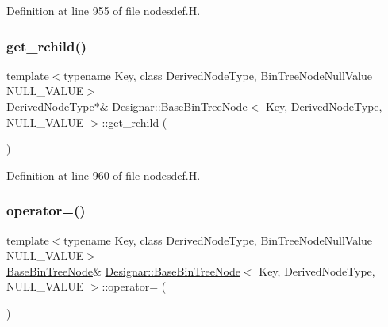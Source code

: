 Definition at line 955 of file nodesdef.\+H.

\mbox{\label{class_designar_1_1_base_bin_tree_node_a328220c701b0c58b024610cf8fb70850}} 
\subsubsection{\texorpdfstring{get\+\_\+rchild()}{get\_rchild()}}
{\footnotesize\ttfamily template$<$typename Key, class Derived\+Node\+Type, Bin\+Tree\+Node\+Null\+Value N\+U\+L\+L\+\_\+\+V\+A\+L\+UE$>$ \\
Derived\+Node\+Type$\ast$\& \hyperlink{class_designar_1_1_base_bin_tree_node}{Designar\+::\+Base\+Bin\+Tree\+Node}$<$ Key, Derived\+Node\+Type, N\+U\+L\+L\+\_\+\+V\+A\+L\+UE $>$\+::get\+\_\+rchild (\begin{DoxyParamCaption}{ }\end{DoxyParamCaption})\hspace{0.3cm}{\ttfamily [inline]}}



Definition at line 960 of file nodesdef.\+H.

\mbox{\label{class_designar_1_1_base_bin_tree_node_acde689f73c8d4fce33926e86882b0765}} 
\subsubsection{\texorpdfstring{operator=()}{operator=()}}
{\footnotesize\ttfamily template$<$typename Key, class Derived\+Node\+Type, Bin\+Tree\+Node\+Null\+Value N\+U\+L\+L\+\_\+\+V\+A\+L\+UE$>$ \\
\hyperlink{class_designar_1_1_base_bin_tree_node}{Base\+Bin\+Tree\+Node}\& \hyperlink{class_designar_1_1_base_bin_tree_node}{Designar\+::\+Base\+Bin\+Tree\+Node}$<$ Key, Derived\+Node\+Type, N\+U\+L\+L\+\_\+\+V\+A\+L\+UE $>$\+::operator= (\begin{DoxyParamCaption}\item[{const \hyperlink{class_designar_1_1_base_bin_tree_node}{Base\+Bin\+Tree\+Node}$<$ Key, Derived\+Node\+Type, N\+U\+L\+L\+\_\+\+V\+A\+L\+UE $>$ \&}]{ }\end{DoxyParamCaption})\hspace{0.3cm}{\ttfamily [delete]}}



